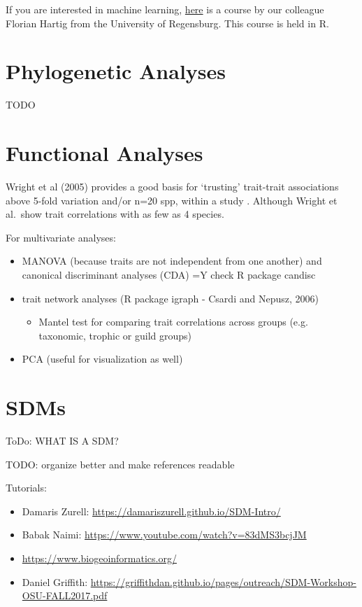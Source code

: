 \documentclass[
]{book}
\providecommand{\tightlist}{%
  \setlength{\itemsep}{0pt}\setlength{\parskip}{0pt}}
\begin{document}
If you are interested in machine learning,
\href{https://theoreticalecology.github.io/machinelearning/index.html}{here}
is a course by our colleague Florian Hartig from the University of
Regensburg. This course is held in R.

\section{Phylogenetic Analyses}\label{phylogenetic-analyses}

TODO

\section{Functional Analyses}\label{functional-analyses}

Wright et al (2005) provides a good basis for `trusting' trait-trait
associations above 5-fold variation and/or n=20 spp, within a study
\citep{wright2005}. Although Wright et al.~show trait correlations with as
few as 4 species.

For multivariate analyses:

\begin{itemize}
\item
  MANOVA (because traits are not independent from one another) and
  canonical discriminant analyses (CDA) =Y check R package candisc
\item
  trait network analyses (R package igraph - Csardi and Nepusz, 2006)

  \begin{itemize}
  \tightlist
  \item
    Mantel test for comparing trait correlations across groups (e.g.
    taxonomic, trophic or guild groups)
  \end{itemize}
\item
  PCA (useful for visualization as well)
\end{itemize}

\section{SDMs}\label{sdms}

ToDo: WHAT IS A SDM?

TODO: organize better and make references readable

Tutorials:

\begin{itemize}
\item
  Damaris Zurell: \url{https://damariszurell.github.io/SDM-Intro/}
\item
  Babak Naimi: \url{https://www.youtube.com/watch?v=83dMS3bcjJM}
\item
  \url{https://www.biogeoinformatics.org/}
\item
  Daniel Griffith:
  \url{https://griffithdan.github.io/pages/outreach/SDM-Workshop-OSU-FALL2017.pdf}
\end{itemize}
\end{document}
